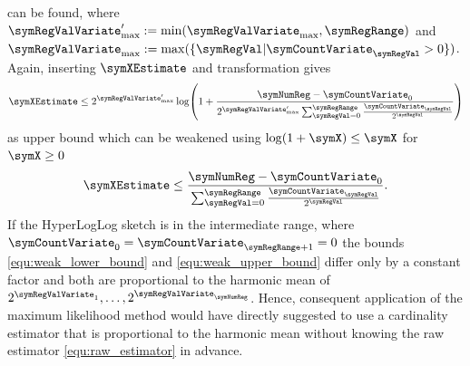 \documentclass[a4paper]{scrartcl}
\begin{document}
can be found, where $\symRegValVariate'_\text{max} := \min(\symRegValVariate_\text{max}, \symRegRange)$ and
$\symRegValVariate_\text{max} := \max(\lbrace \symRegVal\vert\symCountVariate_\symRegVal>0\rbrace)$.
Again, inserting $\symXEstimate$ and transformation gives
\begin{equation}
\label{equ:strong_upper_bound}
\symXEstimate
\leq
2^{\symRegValVariate'_\text{max}}
\log\!\left(
1+
\frac{\symNumReg-\symCountVariate_0}
{
2^{\symRegValVariate'_\text{max}}
\sum_{\symRegVal=0}^{\symRegRange}
\frac{\symCountVariate_\symRegVal}{2^\symRegVal}
}
\right)
\end{equation}
as upper bound which can be weakened using $\log(1+\symX)\leq \symX$ for $\symX\geq 0$
\begin{equation}
\label{equ:weak_upper_bound}
\symXEstimate
\leq
\frac{\symNumReg-\symCountVariate_0}
{\sum_{\symRegVal=0}^{\symRegRange}
\frac{\symCountVariate_\symRegVal}{2^\symRegVal}}.
\end{equation}
If the HyperLogLog sketch is in the intermediate range, where $\symCountVariate_0=\symCountVariate_{\symRegRange+1}=0$ the bounds \eqref{equ:weak_lower_bound} and \eqref{equ:weak_upper_bound} differ only by a constant factor and both are proportional to the harmonic mean of $2^{\symRegValVariate_1},\ldots,2^{\symRegValVariate_\symNumReg}$. Hence, consequent application of the maximum likelihood method would have directly suggested to use a cardinality estimator that is proportional to the harmonic mean without knowing the raw estimator \eqref{equ:raw_estimator} in advance.
\end{document}
